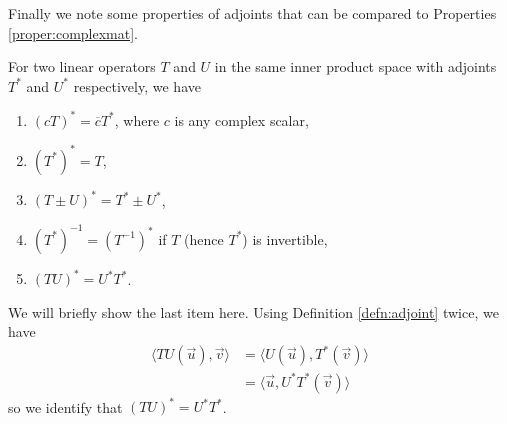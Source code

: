 Finally we note some properties of adjoints that can be compared to Properties \ref{proper:complexmat}.
\begin{proper}
\label{proper:adjoints}
For two linear operators $T$ and $U$ in the same inner product space with adjoints $T^*$ and $U^*$ respectively, we have
\begin{enumerate}
\item $(cT)^* = \overline{c}T^*$, where $c$ is any complex scalar,
\item $(T^*)^* = T$,
\item $(T \pm U)^* = T^* \pm U^*$,
\item $(T^*)^{-1} = (T^{-1})^*$ if $T$ (hence $T^*$) is invertible,
\item $(TU)^* = U^*T^*$.
\end{enumerate}
\end{proper}
We will briefly show the last item here. Using Definition \ref{defn:adjoint} twice, we have
\begin{align*}
\langle TU(\vec{u}), \vec{v} \rangle &= \langle U(\vec{u}), T^*(\vec{v}) \rangle \\
&= \langle \vec{u}, U^*T^*(\vec{v}) \rangle
\end{align*}
so we identify that $(TU)^* = U^*T^*$.

